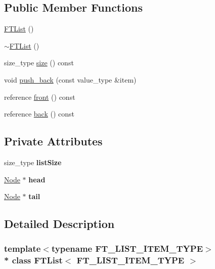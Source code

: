\subsection*{Public Member Functions}
\begin{DoxyCompactItemize}
\item 
\hyperlink{class_f_t_list_a4de727811240b9d8568d1d47fd389502}{F\+T\+List} ()
\item 
\hyperlink{class_f_t_list_aabfac3b136119f727611d490aef3eab4}{$\sim$\+F\+T\+List} ()
\item 
size\+\_\+type \hyperlink{class_f_t_list_a73542705ba9556d5cd594c3ec32fe5d2}{size} () const 
\item 
void \hyperlink{class_f_t_list_acd30af5d1a32185842decac3e0c183ce}{push\+\_\+back} (const value\+\_\+type \&item)
\item 
reference \hyperlink{class_f_t_list_a068805ebb222e9ce69a8828b31fd87df}{front} () const 
\item 
reference \hyperlink{class_f_t_list_ae6b5f56991e9d2ac226ce7960e4661f4}{back} () const 
\end{DoxyCompactItemize}
\subsection*{Private Attributes}
\begin{DoxyCompactItemize}
\item 
size\+\_\+type {\bfseries list\+Size}\hypertarget{class_f_t_list_afd1b669d42ccf658c9a0d9c63bd372c6}{}\label{class_f_t_list_afd1b669d42ccf658c9a0d9c63bd372c6}

\item 
\hyperlink{struct_f_t_list_1_1_node}{Node} $\ast$ {\bfseries head}\hypertarget{class_f_t_list_ac7d65da45a2a260ca8a847af425f58f5}{}\label{class_f_t_list_ac7d65da45a2a260ca8a847af425f58f5}

\item 
\hyperlink{struct_f_t_list_1_1_node}{Node} $\ast$ {\bfseries tail}\hypertarget{class_f_t_list_a194be7b9d0cdee8a806c66090d423166}{}\label{class_f_t_list_a194be7b9d0cdee8a806c66090d423166}

\end{DoxyCompactItemize}


\subsection{Detailed Description}
\subsubsection*{template$<$typename F\+T\+\_\+\+L\+I\+S\+T\+\_\+\+I\+T\+E\+M\+\_\+\+T\+Y\+PE$>$\\*
class F\+T\+List$<$ F\+T\+\_\+\+L\+I\+S\+T\+\_\+\+I\+T\+E\+M\+\_\+\+T\+Y\+P\+E $>$}

